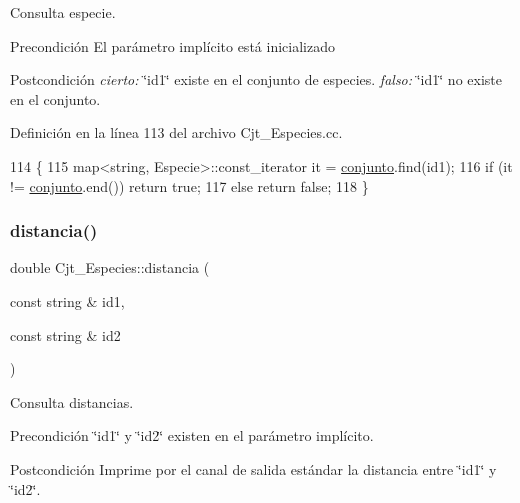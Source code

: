 Consulta especie. 

\begin{DoxyPrecond}{Precondición}
El parámetro implícito está inicializado 
\end{DoxyPrecond}
\begin{DoxyPostcond}{Postcondición}
{\itshape cierto\+:} \char`\"{}id1\char`\"{} existe en el conjunto de especies. {\itshape falso\+:} \char`\"{}id1\char`\"{} no existe en el conjunto. 
\end{DoxyPostcond}


Definición en la línea 113 del archivo Cjt\+\_\+\+Especies.\+cc.


\begin{DoxyCode}
114 \{
115     map<string, Especie>::const\_iterator it = \hyperlink{class_cjt___especies_a82ed53cbd620caca3db6b5c20b37a60a}{conjunto}.find(id1);
116     \textcolor{keywordflow}{if} (it != \hyperlink{class_cjt___especies_a82ed53cbd620caca3db6b5c20b37a60a}{conjunto}.end()) \textcolor{keywordflow}{return} \textcolor{keyword}{true};
117     \textcolor{keywordflow}{else} \textcolor{keywordflow}{return} \textcolor{keyword}{false};
118 \}
\end{DoxyCode}
\mbox{\label{class_cjt___especies_a14c0282be94e2520cca51539118b5b76}} 
\subsubsection{\texorpdfstring{distancia()}{distancia()}}
{\footnotesize\ttfamily double Cjt\+\_\+\+Especies\+::distancia (\begin{DoxyParamCaption}\item[{const string \&}]{id1,  }\item[{const string \&}]{id2 }\end{DoxyParamCaption})}



Consulta distancias. 

\begin{DoxyPrecond}{Precondición}
\char`\"{}id1\char`\"{} y \char`\"{}id2\char`\"{} existen en el parámetro implícito. 
\end{DoxyPrecond}
\begin{DoxyPostcond}{Postcondición}
Imprime por el canal de salida estándar la distancia entre \char`\"{}id1\char`\"{} y \char`\"{}id2\char`\"{}. 
\end{DoxyPostcond}


